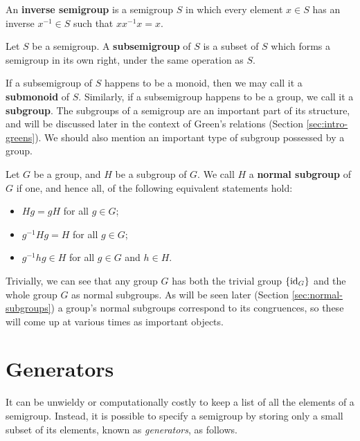 \begin{definition}
  \label{def:inverse-semigroup}
  An \textbf{inverse semigroup} is a semigroup $S$ in which every element $x
  \in S$ has an inverse $x^{-1} \in S$ such that $xx^{-1}x=x$. %
\end{definition}

\begin{definition}
  \label{def:subsemigroup}
  Let $S$ be a semigroup.  A \textbf{subsemigroup} of $S$ is a subset of $S$
  which forms a semigroup in its own right, under the same operation as $S$.
\end{definition}

If a subsemigroup of $S$ happens to be a monoid, then we may call it a
\textbf{submonoid} of $S$.  Similarly, if a subsemigroup happens to be a group,
we call it a \textbf{subgroup}.  The subgroups of a semigroup are an important
part of its structure, and will be discussed later in the context of Green's
relations (Section \ref{sec:intro-greens}).  We should also mention an important
type of subgroup possessed by a group.

\begin{definition}
  \label{def:normal-subgroup}
  Let $G$ be a group, and $H$ be a subgroup of $G$.  We call $H$ a
  \textbf{normal subgroup} of $G$ if one, and hence all, of the following
  equivalent statements hold:
  \begin{itemize}
  \item $Hg = gH$ for all $g \in G$;
  \item $g^{-1}Hg = H$ for all $g \in G$;
  \item $g^{-1}hg \in H$ for all $g \in G$ and $h \in H$.
  \end{itemize}
\end{definition}

Trivially, we can see that any group $G$ has both the trivial group $\{\operatorname{id}_G\}$
and the whole group $G$ as normal subgroups.  As will be seen later (Section
\ref{sec:normal-subgroups}) a group's normal subgroups correspond to its
congruences, so these will come up at various times as important objects.

\section{Generators}
\label{sec:intro-generators}

It can be unwieldy or computationally costly to keep a list of all the elements
of a semigroup.  Instead, it is possible to specify a semigroup by storing only
a small subset of its elements, known as \textit{generators}, as follows.

